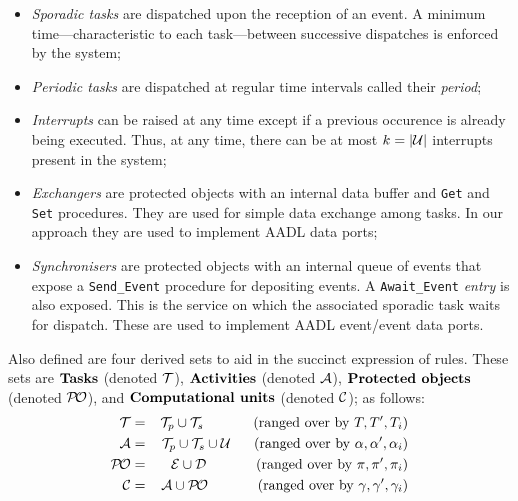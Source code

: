 \begin{itemize}
  \item{\emph{Sporadic tasks} are dispatched upon the reception of an
    event. A minimum time---characteristic to each task---between
    successive dispatches is enforced by the system;}
  \item{\emph{Periodic tasks} are dispatched at regular time intervals
    called their \emph{period};}
  \item{\emph{Interrupts} can be raised at any time except if a
    previous occurence is already being executed. Thus, at any time,
    there can be at most ${k=|\cal U|}$ interrupts present in the
    system;}
  \item{\emph{Exchangers} are protected objects with an internal data
    buffer and \texttt{Get} and \texttt{Set} procedures. They are used
    for simple data exchange among tasks. In our approach they are used
    to implement AADL data ports;}
  \item{\emph{Synchronisers} are protected objects with an internal
    queue of events that expose a \texttt{Send\_Event} procedure for
    depositing events. A \texttt{Await\_Event} \emph{entry} is also
    exposed. This is the service on which the associated sporadic task
    waits for dispatch. These are used to implement AADL event/event data
    ports.}
\end{itemize}

Also defined are four derived sets to aid in the succinct expression
of rules. These sets are $\text{\textbf{Tasks}}$ (denoted ${\cal T}$),
$\text{\textbf{Activities}}$ (denoted ${\cal A}$),
$\text{\textbf{Protected objects}}$ (denoted ${\cal P\!O}$), and
$\text{\textbf{Computational units}}$ (denoted ${\cal C}$); as
follows:
\begin{eqnarray}
  {\cal T} & = & {\cal T}_p\cup {\cal T}_s
  \ \ \ \ \ \ \ \ \ \ \: \text{(ranged over by} \ T, T', T_i \text{)} \nonumber \\
  {\cal A}  & =  & \, {\cal T}_p\cup {\cal T}_s \cup
  {\cal U} \ \ \ \ \ \text{(ranged over by} \ \alpha, \alpha',
  \alpha_i \text{)} \nonumber \\
  {\cal P\!O} & = & \ \, 
  {\cal E} \cup {\cal D} \ \ \ \ \ \: \ \ \ \ \ \text{(ranged over by} \ \pi, \pi',
  \pi_i \nonumber \text{)} \\
{\cal C} & = & {\cal A}
  \cup {\cal P\!O} \ \ \ \ \ \: \ \ \ \ \ \text{(ranged over by} \ \gamma, \gamma',
  \gamma_i \text{)} \nonumber
\end{eqnarray}

